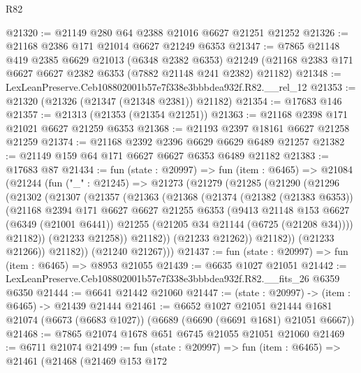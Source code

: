 \begin{lexlean}{R82}
\begin{coremodule}
@21320 := @21149 @280 @64 @2388 @21016 @6627 @21251 @21252
@21326 := @21168 @2386 @171 @21014 @6627 @21249 @6353
@21347 := @7865
    @21148
    @419
    @2385
    @6629
    @21013
    (@6348 @2382 @6353)
    @21249
    (@21168 @2383 @171 @6627 @6627 @2382 @6353 (@7882 @21148 @241 @2382) @21182)
@21348 := LexLeanPreserve.Ceb108802001b57e7f338e3bbbdea932f.R82.__rel_12
@21353 := @21320 (@21326 (@21347 (@21348 @2381)) @21182)
@21354 := @17683 @146
@21357 := @21313 (@21353 (@21354 @21251))
@21363 := @21168 @2398 @171 @21021 @6627 @21259 @6353
@21368 := @21193 @2397 @18161 @6627 @21258 @21259
@21374 := @21168 @2392 @2396 @6629 @6629 @6489 @21257
@21382 := @21149 @159 @64 @171 @6627 @6627 @6353 @6489 @21182
@21383 := @17683 @87
@21434 := fun (state : @20997) =>
  fun (item : @6465) =>
  @21084
    (@21244
      (fun ("_" : @21245) =>
      @21273
        (@21279
          (@21285
            (@21290
              (@21296
                (@21302
                  (@21307
                    (@21357
                      (@21363
                        (@21368
                          (@21374
                            (@21382 (@21383 @6353))
                            (@21168
                              @2394
                              @171
                              @6627
                              @6627
                              @21255
                              @6353
                              (@9413
                                @21148
                                @153
                                @6627
                                (@6349 (@21001 @6441))
                                @21255
                                (@21205 @34 @21144 (@6725 (@21208 @34))))
                              @21182))
                          (@21233 @21258))
                        @21182))
                    (@21233 @21262))
                  @21182))
              (@21233 @21266))
            @21182))
        (@21240 @21267)))
@21437 := fun (state : @20997) => fun (item : @6465) => @8953 @21055
@21439 := @6635 @1027 @21051
@21442 := LexLeanPreserve.Ceb108802001b57e7f338e3bbbdea932f.R82.__fits_26 @6359 @6350
@21444 := @6641 @21442 @21060
@21447 := (state : @20997) -> (item : @6465) -> @21439 @21444
@21461 := @6652
    @1027
    @21051
    @21444
    @1681
    @21074
    (@6673 (@6683 @1027))
    (@6689 (@6690 (@6691 @1681) @21051 @6667))
@21468 := @7865 @21074 @1678 @651 @6745 @21055 @21051 @21060
@21469 := @6711 @21074
@21499 := fun (state : @20997) =>
  fun (item : @6465) =>
  @21461
    (@21468
      (@21469
        @153
        @172

\end{coremodule}
\end{lexlean}

